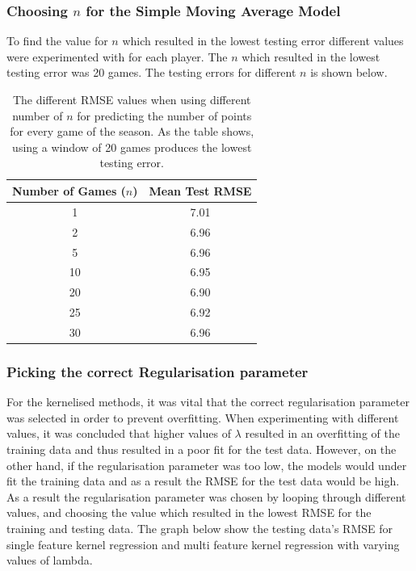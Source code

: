 \documentclass[a4paper,11pt,twoside]{article}
\begin{document}
\subsubsection{Choosing $n$ for the Simple Moving Average Model}

To find the value for $n$ which resulted in the lowest testing error different values were experimented with for each player. The $n$ which resulted in the lowest  testing error was 20 games. The testing errors for different $n$ is shown below.

\vspace{5mm}
\begin{table}[h!]
\captionsetup{justification=centering}
\begin{center}
\begin{tabular}{ |c|c|} 
 \hline
     \textbf{Number of Games ($n$)} & \textbf{Mean Test RMSE}\\ 
 \hline
 1  & 7.01\\ 
 \hline
 2 & 6.96\\ 
 \hline
 5  & 6.96 \\
 \hline
 10  & 6.95\\
 \hline
 20 & 6.90\\
 \hline
 25  & 6.92\\
 \hline
30 & 6.96\\
\hline
\end{tabular}
\end{center}
\caption{The different RMSE values when using different number of $n$ for predicting the number of points for every game of the season. As the table shows, using a window of 20 games produces the lowest testing error.}
\end{table}
\vspace{5mm}

\subsubsection{Picking the correct Regularisation parameter}

For the kernelised methods, it was vital that the correct regularisation parameter was selected in order to prevent overfitting. When experimenting with different values, it was concluded that higher values of $\lambda$ resulted in an overfitting of the training data and thus resulted in a poor fit for the test data. However, on the other hand, if the regularisation parameter was too low, the models would under fit the training data and as a result the RMSE for the test data would be high. As a result the regularisation parameter was chosen by looping through different values, and choosing the value which resulted in the lowest RMSE for the training and testing data. The graph below show the testing data's RMSE for single feature kernel regression and multi feature kernel regression with varying values of lambda. 
\end{document}
